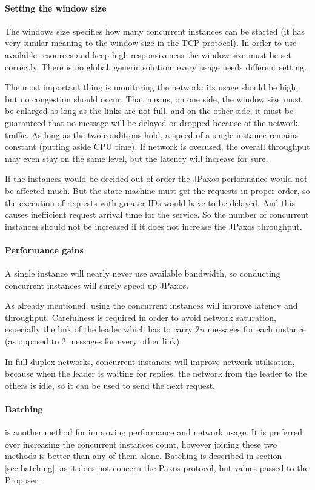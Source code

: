\paragraph{Setting the window size}
The windows size specifies how many concurrent instances can be started (it has very similar meaning to the window size in the TCP protocol). In order to use available resources and keep high responsiveness the window size must be set correctly. There is no global, generic solution: every usage needs different setting.

The most important thing is monitoring the network: its usage should be high, but no congestion should occur.
That means, on one side, the window size must be enlarged as long as the links are not full, and on the other side, it must be guaranteed that no message will be delayed or dropped because of the network traffic. As long as the two conditions hold, a speed of a single instance remains constant (putting aside CPU time).
If network is overused, the overall throughput may even stay on the same level, but the latency will increase for sure.

If the instances would be decided out of order the JPaxos performance would not be affected much. But the state machine must get the requests in proper order, so the execution of requests with greater IDs would have to be delayed. And this causes inefficient request arrival time for the service. So the number of concurrent instances should not be increased if it does not increase the JPaxos throughput.

\paragraph{Performance gains}
A single instance will nearly never use available bandwidth, so conducting concurrent instances will surely speed up JPaxos.

As already mentioned, using the concurrent instances will improve latency and throughput. Carefulness is required in order to avoid network saturation, especially the link of the leader which has to carry $2n$ messages for each instance (as opposed to 2 messages for every other link).

In full-duplex networks, concurrent instances will improve network utilisation, because when the leader is waiting for replies, the network from the leader to the others is idle, so it can be used to send the next request. 

\paragraph{Batching} is another method for improving performance and network usage. It is preferred over increasing the concurrent instances count, however joining these two methods is better than any of them alone. Batching is described in section \ref{sec:batching}, as it does not concern the Paxos protocol, but values passed to the Proposer.

